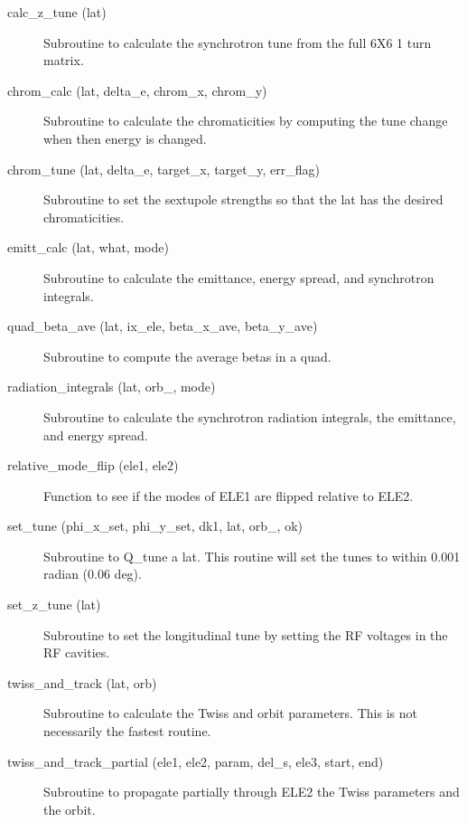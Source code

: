 \begin{description}

\item[calc_z_tune (lat)] \Newline
Subroutine to calculate the synchrotron tune from the full 6X6 1 turn matrix. 

\item[chrom_calc (lat, delta_e, chrom_x, chrom_y)] \Newline
Subroutine to calculate the chromaticities by computing the tune 
change when then energy is changed. 

\item[chrom_tune (lat, delta_e, target_x, target_y, err_flag)] \Newline
Subroutine to set the sextupole strengths so that the lat 
has the desired chromaticities. 

\item[emitt_calc (lat, what, mode)] \Newline
Subroutine to calculate the emittance, energy spread, and synchrotron integrals. 

\item[quad_beta_ave (lat, ix_ele, beta_x_ave, beta_y_ave)] \Newline
Subroutine to compute the average betas in a quad.

\item[radiation_integrals (lat, orb_, mode)] \Newline
Subroutine to calculate the synchrotron radiation integrals, the emittance, and energy spread. 

\item[relative_mode_flip (ele1, ele2)] \Newline
Function to see if the modes of ELE1 are flipped relative to ELE2. 

\item[set_tune (phi_x_set, phi_y_set, dk1, lat, orb_, ok)] \Newline
Subroutine to Q_tune a lat. This routine will set the tunes to within 0.001 radian (0.06 deg). 

\item[set_z_tune (lat)] \Newline
Subroutine to set the longitudinal tune by setting the RF voltages in the RF cavities. 

\item[twiss_and_track (lat, orb)] \Newline
Subroutine to calculate the Twiss and orbit parameters. 
This is not necessarily the fastest routine. 

\item[twiss_and_track_partial (ele1, ele2, param, del_s, ele3, start, end)] \Newline
Subroutine to propagate partially through ELE2 the Twiss parameters and the orbit. 


\end{description}
